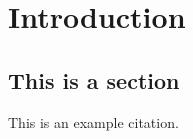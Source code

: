 \chapter{Introduction}
\label{cha:Introduction}

\section{This is a section}
\label{sec:section1}
This is an example citation\cite{carmignani_visualization_2002}.